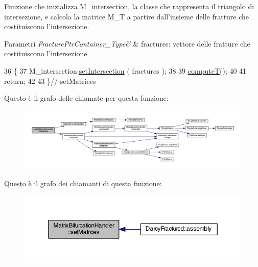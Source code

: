 Funzione che inizializza M\-\_\-intersection, la classe che rappresenta il triangolo di intersezione, e calcola la matrice M\-\_\-\-T a partire dall'insieme delle fratture che costituiscono l'intersezione. 


\begin{DoxyParams}{Parametri}
{\em Fracture\-Ptr\-Container\-\_\-\-Type\&} & fractures\-: vettore delle fratture che costituiscono l'intersezione \\
\hline
\end{DoxyParams}

\begin{DoxyCode}
36 \{
37     M\_intersection.\hyperlink{classIntersection_ab7a139ac5712a9aa8bb925caf4ecc8af}{setIntersection} ( fractures );
38     
39     \hyperlink{classMatrixBifurcationHandler_a46ee3c60eedda32abe36700ab2ce2d16}{computeT}(); 
40     
41     \textcolor{keywordflow}{return};
42 
43 \}\textcolor{comment}{// setMatrices}
\end{DoxyCode}


Questo è il grafo delle chiamate per questa funzione\-:\nopagebreak
\begin{figure}[H]
\begin{center}
\leavevmode
\includegraphics[width=350pt]{classMatrixBifurcationHandler_a94433cf28ec2af6ba06b7f63a081d787_cgraph}
\end{center}
\end{figure}




Questo è il grafo dei chiamanti di questa funzione\-:\nopagebreak
\begin{figure}[H]
\begin{center}
\leavevmode
\includegraphics[width=350pt]{classMatrixBifurcationHandler_a94433cf28ec2af6ba06b7f63a081d787_icgraph}
\end{center}
\end{figure}


